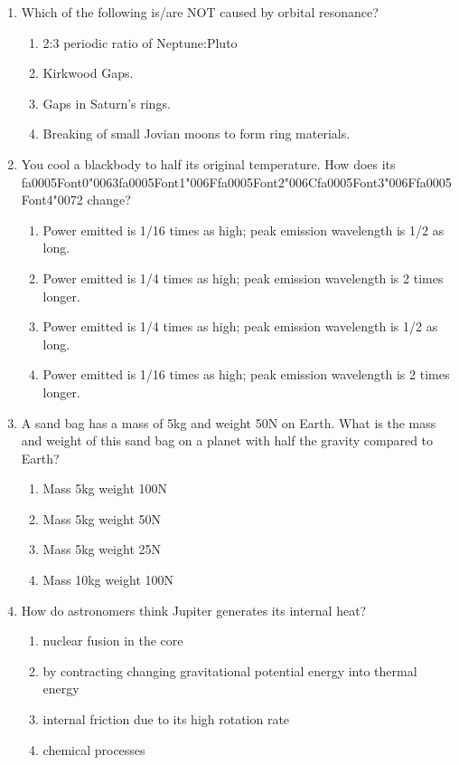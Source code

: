 \documentclass[12pt]{article}
\begin{document}
\begin{enumerate}[label=\arabic*.]
\begin{enumerate}[label=(\alph*)]
\end{enumerate}
\item Which of the following is/are NOT caused by orbital resonance?
\begin{enumerate}[label=(\alph*)]
    \item 2:3 periodic ratio of Neptune:Pluto
    \item Kirkwood Gaps.
    \item Gaps in Saturn's rings.
    \item Breaking of small Jovian moons to form ring materials.
\end{enumerate}
\item You cool a blackbody to half its original temperature. How does its {\csname fa0005Font0\endcsname\char"0063}{\csname fa0005Font1\endcsname\char"006F}{\csname fa0005Font2\endcsname\char"006C}{\csname fa0005Font3\endcsname\char"006F}{\csname fa0005Font4\endcsname\char"0072} change?
\begin{enumerate}[label=(\alph*)]
    \item Power emitted is 1/16 times as high; peak emission wavelength is 1/2 as long.
    \item Power emitted is 1/4 times as high; peak emission wavelength is 2 times longer.
    \item Power emitted is 1/4 times as high; peak emission wavelength is 1/2 as long.
    \item Power emitted is 1/16 times as high; peak emission wavelength is 2 times longer.
\end{enumerate}
\item A sand bag has a mass of 5kg and weight 50N on Earth. What is the mass and weight of this
sand bag on a planet with half the gravity compared to Earth?
\begin{enumerate}[label=(\alph*)]
    \item Mass 5kg weight 100N
    \item Mass 5kg weight 50N
    \item Mass 5kg weight 25N
    \item Mass 10kg weight 100N
\end{enumerate}
\item How do astronomers think Jupiter generates its internal heat?
\begin{enumerate}[label=(\alph*)]
    \item nuclear fusion in the core
    \item by contracting changing gravitational potential energy into thermal energy
    \item internal friction due to its high rotation rate
    \item chemical processes
\end{enumerate}
\end{enumerate}
\end{document}
